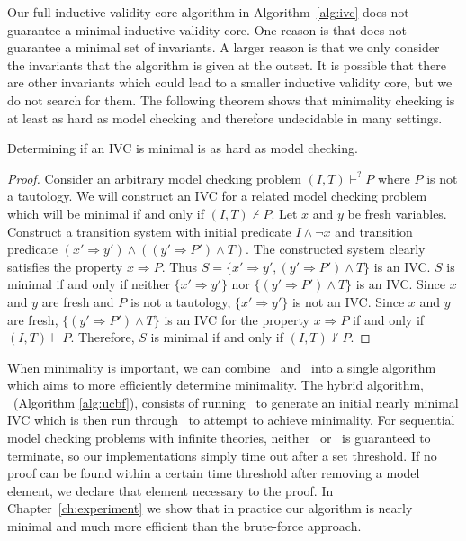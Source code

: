 Our full inductive validity core algorithm in Algorithm~\ref{alg:ivc}
does not guarantee a minimal inductive validity core. One reason is
that \reduceinv does not guarantee a minimal set of invariants. A
larger reason is that we only consider the invariants that the
algorithm is given at the outset. It is possible that there are other
invariants which could lead to a smaller inductive validity core, but
we do not search for them. The
following theorem shows that minimality checking is at least as hard
as model checking and therefore undecidable in many settings.

\begin{theorem}
\label{thm:minimal-hard}
Determining if an IVC is minimal is as hard as model checking.
\end{theorem}
\begin{proof}
Consider an arbitrary model checking problem $(I, T)\vdash^? P$ where
$P$ is not a tautology. We will construct an IVC for a related model
checking problem which will be minimal if and only if $(I, T)\nvdash
P$. Let $x$ and $y$ be fresh variables. Construct a transition system
with initial predicate $I\land \neg x$ and transition predicate $(x'
\Rightarrow y') \land ((y' \Rightarrow P') \land T)$. The constructed
system clearly satisfies the property $x \Rightarrow P$. Thus $S = \{x'
\Rightarrow y', (y' \Rightarrow P') \land T\}$ is an IVC. $S$ is
minimal if and only if neither $\{x' \Rightarrow y'\}$ nor $\{(y'
\Rightarrow P') \land T\}$ is an IVC. Since $x$ and $y$ are fresh and
$P$ is not a tautology, $\{x' \Rightarrow y'\}$ is not an IVC. Since
$x$ and $y$ are fresh, $\{(y' \Rightarrow P') \land T\}$ is an IVC for
the property $x \Rightarrow P$ if and only if $(I, T)\vdash P$.
Therefore, $S$ is minimal if and only if $(I, T)\nvdash P$.
\end{proof}

When minimality is important, we can combine \bfalg\ and \ucalg\ into
a single algorithm which aims to more efficiently determine minimality.  The
hybrid algorithm, \ucbfalg\ (Algorithm \ref{alg:ucbf}), consists of running \ucalg\ to generate an
initial nearly minimal IVC which is then run through \bfalg\ to
attempt to achieve minimality.   For sequential model checking problems with infinite theories, neither \bfalg\ or \ucbfalg\ is guaranteed to terminate, so our implementations simply time out after a set threshold.  If no proof can be found within a certain time threshold after removing a model element, we declare that element necessary to the proof. In Chapter~\ref{ch:experiment} we show that in practice our algorithm is nearly
minimal and much more efficient than the brute-force approach.

